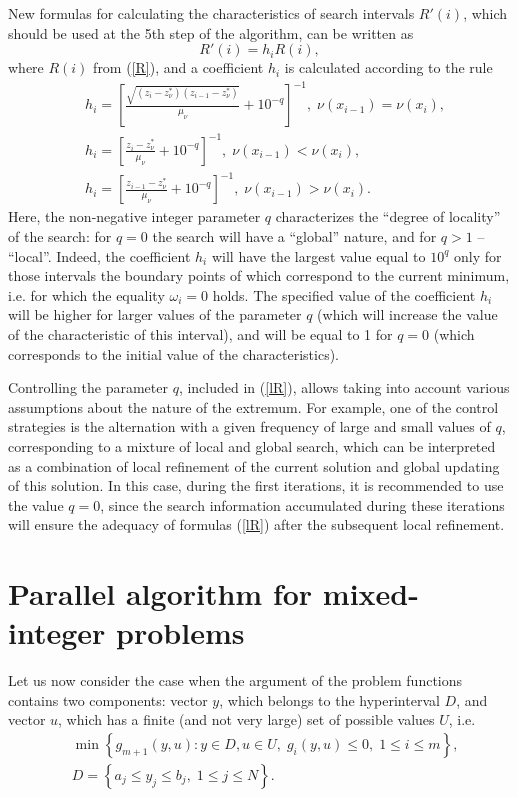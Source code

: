 \documentclass[
11pt,%
tightenlines,%
twoside,%
onecolumn,%
nofloats,%
nobibnotes,%
nofootinbib,%
superscriptaddress,%
noshowpacs,%
centertags]%
{revtex4}
\begin{document}
New formulas for calculating the characteristics of search intervals $R'(i)$, which should be used at the 5th step of the algorithm, can be written as
\[
R'(i) = h_i R(i),
\]
where $R(i)$ from (\ref{R}), and a coefficient $h_i$ is calculated  according to the rule
\begin{eqnarray}\label{lR}
& h_i = \left[\frac{\sqrt{(z_i-z_\nu^*)(z_{i-1}-z_\nu^*)}}{\mu_\nu}+10^{-q}\right]^{-1}, \; \nu(x_{i-1})=\nu(x_{i}),\nonumber\\
& h_i = \left[\frac{z_i-z_\nu^*}{\mu_\nu}+10^{-q}\right]^{-1}, \; \nu(x_{i-1})<\nu(x_{i}),\\
& h_i = \left[\frac{z_{i-1}-z_\nu^*}{\mu_\nu}+10^{-q}\right]^{-1}, \; \nu(x_{i-1})>\nu(x_{i}).\nonumber
\end{eqnarray}
Here, the non-negative integer parameter $q$ characterizes the ``degree of locality'' of the search: for $q=0$ the search will have a ``global'' nature, and for $q>1$ -- ``local''. 
Indeed, the coefficient $h_i$ will have the largest value equal to $10^q$ only for those intervals the boundary points of which correspond to the current minimum, i.e. for which the equality $\omega_i = 0$ holds. The specified value of the coefficient $h_i$ will be higher for larger values of the parameter $q$ (which will increase the value of the characteristic of this interval), and will be equal to 1 for $q=0$ (which corresponds to the initial value of the characteristics). 

Controlling the parameter $q$, included in (\ref{lR}), allows taking into account various assumptions about the nature of the extremum. For example, one of the control strategies is the alternation with a given frequency of large and small values of $q$, corresponding to a mixture of local and global search, which can be interpreted as a combination of local refinement of the current solution and global updating of this solution. In this case, during the first iterations, it is recommended to use the value $q=0$, since the search information accumulated during these iterations will ensure the adequacy of formulas (\ref{lR}) after the subsequent local refinement.


\section{Parallel algorithm for mixed-integer problems}

Let us now consider the case when the argument of the problem functions contains two components: vector $y$, which belongs to the hyperinterval $D$, and vector $u$, which has a finite (and not very large) set of possible values $U$, i.e.
\begin{eqnarray}\label{problem_i}
& \min{\left\{ g_{m+1}(y,u):y\in D, u \in U, \; g_i(y,u)\leq 0, \; 1 \leq i \leq m\right\}},\\
& D=\left\{a_j\leq y_j \leq b_j, \; 1\leq j \leq N \right\}.\nonumber
\end{eqnarray}
\end{document}
